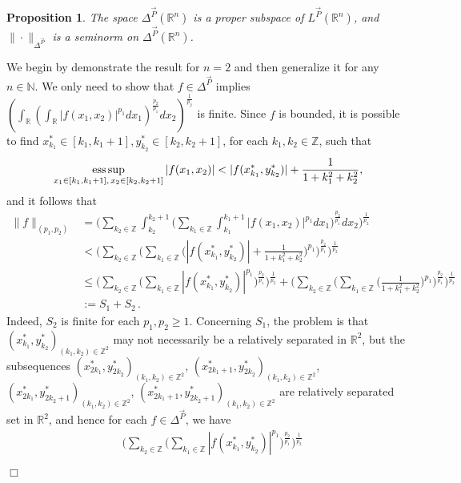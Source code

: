 \documentclass[11pt, a4paper]{article}
\newtheorem{prop}[thm]{Proposition}
\theoremstyle{definition}
\newcommand{\qedwhite}{\hfill \ensuremath{\Box}}
\renewenvironment{proof}{{\raggedright \bfseries Proof.}}{\qedwhite}
\numberwithin{equation}{section}
\def\NN{\mathbb N}
\def\ZZ{\mathbb Z}
\def\RR{\mathbb R}
\def\esssup{\mathop{\textup{ess}\sup}}
\newcommand{\vc}[1]{\overrightarrow{#1}}
\begin{document}
\begin{prop} \label{p1}
    The space $\Delta^{\vc{P}}(\RR^n)$ is a proper subspace of $L^{\overrightarrow{P}}(\RR^n)$, and $\|\cdot\|_{\Delta^{\vc{P}}}$ is a seminorm on $\Delta^{\vc{P}}(\RR^n)$.
\end{prop}
\begin{proof}
    We begin by demonstrate the result for $n=2$ and then generalize it for any $n \in \NN$.
    We only need to show that $f \in \Delta^{\overrightarrow{P}}$ implies $\displaystyle \left(\int_{\RR}\left(\int_{\RR} |f(x_1,x_2)|^{p_1}dx_1 \right)^{\frac{p_2}{p_1}}dx_2 \right)^{\frac{1}{p_2}}$ is finite. Since $f$ is bounded, it is possible to find $x_{k_1} ^{*}\in [k_1,k_1+1],y_{k_2}^{*}\in [k_2,k_2+1]$, for each $k_1,k_2 \in \ZZ$, such that 
    \[ \esssup_{x_1 \in [k_1,k_1+1], \, x_2 \in [k_2,k_2+1]} |f(x_1, x_2)| < |f(x_{k_1}^{*},y_{k_2}^{*})| + \frac{1}{1+k_1^2+k_2^2},\]
    and it follows that
    \begin{align*}
        \|f\|_{(p_1,p_2)} & =\Bigg(\sum_{k_2 \in\ZZ}\int_{k_2}^{k_2+1}\Bigg(\sum_{k_1 \in \ZZ} \int_{k_1}^{k_1+1}|f(x_1,x_2)|^{p_1}dx_1\Bigg)^{\frac{p_2}{p_1}}dx_2\Bigg)^{\frac{1}{p_2}}\\
		& < \Bigg( \sum_{k_2 \in \ZZ}\Bigg(\sum_{k_1 \in \ZZ}\Bigg(|f(x_{k_1}^{*},y_{k_2}^{*})|+ \frac{1}{1+k_1^2+k_2^2}\Bigg)^{p_1}\Bigg)^{\frac{p_2}{p_1}}\Bigg)^{\frac{1}{p_2}}\\
		& \leq \Bigg(\sum_{k_2 \in \ZZ}\Bigg( \sum_{k_1 \in \ZZ}|f(x_{k_1}^{*},y_{k_2}^{*})|^{p_1}\Bigg)^{\frac{p_2}{p_1}}\Bigg)^{\frac{1}{p_2}}+ \Bigg(\sum_{k_2 \in \ZZ}\Bigg(\sum_{k_1 \in \ZZ} \Bigg( \frac{1}{1+k_1^2+k_2^2}\Bigg)^{p_1}\Bigg)^{\frac{p_2}{p_1}}\Bigg)^{\frac{1}{p_2}}  \\
		&:= S_1+S_2 \hspace{2pt}.
    \end{align*}
    Indeed, $S_2$ is finite for each $p_1,p_2\geq 1$. Concerning $S_1$, the problem is that $(x_{k_1}^{*},y_{k_2}^{*})_ {(k_1,k_2) \in \ZZ^2}$ may not necessarily be a relatively separated in $\RR^2$, but the subsequences $(x_{2k_1}^{*},y_{2k_2}^{*})_ {(k_1,k_2) \in \ZZ^2}$, $(x_{2k_1+1}^{*},y_{2k_2}^{*})_ {(k_1,k_2) \in \ZZ^2}$, $(x_{2k_1}^{*},y_{2k_2+1}^{*})_ {(k_1,k_2) \in \ZZ^2}$, $(x_{2k_1+1}^{*},y_{2k_2+1}^{*})_ {(k_1,k_2) \in \ZZ^2}$ are relatively separated set in $\RR^2$, and hence for each $f \in \Delta^{\overrightarrow{P}}$, we have
    \begin{align*} 
        &\Bigg( \sum_{k_2 \in \mathbb{Z}}\Bigg( \sum_{k_1 \in \mathbb{Z}} |f(x_{k_1}^*, y_{k_2}^*)|^{p_1} \Bigg)^{\frac{p_2}{p_1}}\Bigg)^{\frac{1}{p_2}}\\

\end{align*}
\end{proof}
\end{document}
